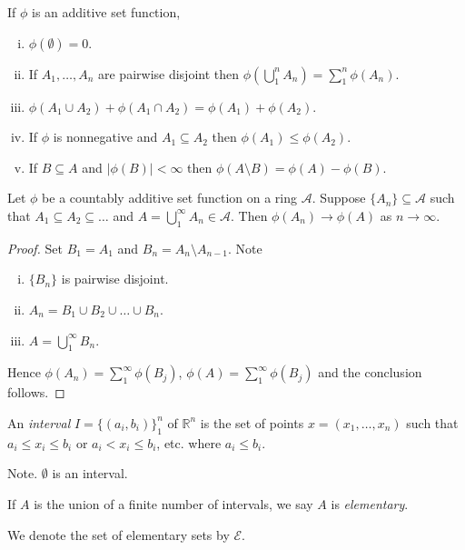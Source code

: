 \documentclass[11pt]{article}
\begin{document}
\begin{remark}
    If $\phi$ is an additive set function,
    \begin{enumerate} [(i), nosep, left=0pt]
        \item $\phi(\emptyset) = 0$.
        \item If $A_1, \dots, A_n$ are pairwise disjoint then $\phi(\bigcup_1^n A_n) = \sum_1^n \phi(A_n)$.
        \item $\phi(A_1 \cup A_2) + \phi(A_1 \cap A_2) = \phi(A_1) + \phi(A_2)$.
        \item If $\phi$ is nonnegative and $A_1 \subseteq A_2$ then $\phi(A_1) \le \phi(A_2)$.
        \item If $B \subseteq A$ and $|\phi(B)| < \infty$ then $\phi(A \setminus B) = \phi(A) - \phi(B)$. 
    \end{enumerate}
\end{remark}

\begin{theorem}
    Let $\phi$ be a countably additive set function on a ring $\mathscr{A}$. Suppose $\{ A_n \} \subseteq \mathscr{A}$ such that $A_1 \subseteq A_2 \subseteq \dots$ and $A = \bigcup_1^\infty A_n \in \mathscr{A}$. Then $\phi(A_n) \to \phi(A)$ as $n \to \infty$. 
\end{theorem}
\begin{proof}
    Set $B_1 = A_1$ and $B_n = A_n \setminus A_{n-1}$. Note \begin{enumerate} [(i), nosep, left=0pt]
        \item $\{ B_n \}$ is pairwise disjoint.
        \item $A_n = B_1 \cup B_2 \cup \dots \cup B_n$.
        \item $A = \bigcup_1^\infty B_n$.
    \end{enumerate}
    Hence $\phi(A_n) = \sum_1^\infty \phi(B_j)$, $\phi(A) = \sum_1^\infty \phi(B_j)$ and the conclusion follows.
\end{proof}

\begin{definition}
    An \emph{interval} $I = \{ (a_i, b_i) \}_1^n$ of $\mathbb{R}^n$ is the set of points $x = (x_1, \dots, x_n)$ such that $a_i \le x_i \le b_i$ or $a_i < x_i \le b_i$, etc. where $a_i \le b_i$. 
\end{definition}
Note. $\emptyset$ is an interval. 

\begin{definition}
    If $A$ is the union of a finite number of intervals, we say $A$ is \emph{elementary}.
\end{definition}
We denote the set of elementary sets by $\mathscr{E}$. 
\end{document}
